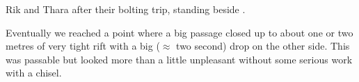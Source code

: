 \begin{marginfigure}
\caption{Rik and Thara after their bolting trip, standing beside . }
\end{marginfigure}


Eventually we reached a point where a big passage closed up to about one
or two metres of very tight rift with a big ($\approx$ two second) drop on
the other side. This was passable but looked more than a little
unpleasant without some serious work with a chisel.


